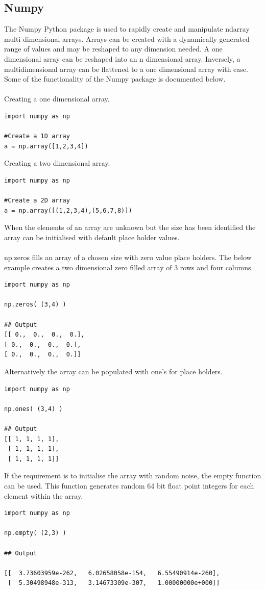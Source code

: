 \subsection{Numpy}
The Numpy Python package is used to rapidly create and manipulate ndarray multi dimensional arrays. Arrays can be created with a dynamically generated range of values and may be reshaped to any dimension needed. A one dimensional array can be reshaped into an n dimensional array. Inversely, a multidimensional array can be flattened to a one dimensional array with ease. Some of the functionality of the Numpy package is documented below.~\cite{Quicksta66:online}\\\\
Creating a one dimensional array.
\begin{verbatim}
import numpy as np

#Create a 1D array
a = np.array([1,2,3,4])
\end{verbatim} 
 Creating a two dimensional array.
\begin{verbatim}
import numpy as np
 
#Create a 2D array
a = np.array([(1,2,3,4),(5,6,7,8)])
\end{verbatim}
When the elements of an array are unknown but the size has been identified the array can be initialised with default place holder values.\\\\
np.zeros fills an array of a chosen size with zero value place holders.
The below example creates a two dimensional zero filled array of 3 rows and four columns.
\begin{verbatim}
import numpy as np
 
np.zeros( (3,4) )
 
## Output
[[ 0.,  0.,  0.,  0.],
[ 0.,  0.,  0.,  0.],
[ 0.,  0.,  0.,  0.]]
\end{verbatim}
Alternatively the array can be populated with one's for place holders.
\begin{verbatim}
import numpy as np
 
np.ones( (3,4) )
 
## Output
[[ 1, 1, 1, 1],
 [ 1, 1, 1, 1],
 [ 1, 1, 1, 1]]
\end{verbatim}
If the requirement is to initialise the array with random noise, the empty function can be used. This function generates random 64 bit float point integers for each element within the array.
\begin{verbatim}
import numpy as np
 
np.empty( (2,3) )
 
## Output
                                 
[[  3.73603959e-262,   6.02658058e-154,   6.55490914e-260],
 [  5.30498948e-313,   3.14673309e-307,   1.00000000e+000]]
\end{verbatim}
